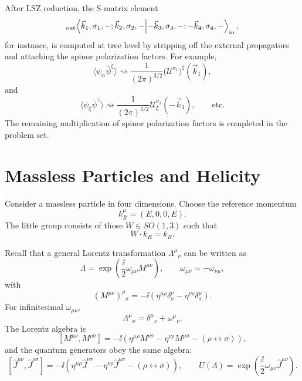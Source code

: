 After LSZ reduction, the S-matrix element
\[
  {}_{\mathrm{out}}\!\bra{
    \vec k_1,\sigma_1,-;\vec k_2,\sigma_2,-
  }
  \ket{
    -\vec k_3,\sigma_3,-;-\vec k_4,\sigma_4,-
  }_{\mathrm{in}},
\]
for instance, is computed at tree level by stripping off the external
propagators and attaching the spinor polarization factors.  For example,
\[
  \langle\psi_\alpha\bar\psi^\xi\rangle
  \rightsquigarrow
  \frac1{(2\pi)^{3/2}}
  \bigl(\mathcal U^{\sigma_1}\bigr)^\xi(\vec k_1),
\]
and
\[
  \langle\psi_\xi\bar\psi^\gamma\rangle
  \rightsquigarrow
  \frac1{(2\pi)^{3/2}}
  \mathcal U_\xi^{\sigma_3}(-\vec k_3),
  \qquad \text{etc.}
\]
The remaining multiplication of spinor polarization factors is completed
in the problem set.

\section{Massless Particles and Helicity}

Consider a massless particle in four dimensions.  Choose the reference
momentum
\[
  k_R^\mu=(E,0,0,E).
\]
The little group consists of those \(W\in SO(1,3)\) such that
\[
  W\cdot k_R=k_R.
\]

Recall that a general Lorentz transformation \(\Lambda^\mu{}_\nu\) can be
written as
\[
  \Lambda=\exp\!\left(\frac{\ii}{2}\omega_{\mu\nu}M^{\mu\nu}\right),
  \qquad
  \omega_{\mu\nu}=-\omega_{\nu\mu},
\]
with
\[
  (M^{\mu\nu})^\rho{}_\sigma
  =
  -\ii\left(
    \eta^{\mu\rho}\delta^\nu_\sigma
    -\eta^{\nu\rho}\delta^\mu_\sigma
  \right).
\]
For infinitesimal \(\omega_{\mu\nu}\),
\[
  \Lambda^\mu{}_\nu=\delta^\mu{}_\nu+\omega^\mu{}_\nu.
\]
The Lorentz algebra is
\[
  [M^{\mu\nu},M^{\rho\sigma}]
  =
  -\ii\left(
    \eta^{\mu\rho}M^{\nu\sigma}
    -\eta^{\nu\rho}M^{\mu\sigma}
    -(\rho\leftrightarrow\sigma)
  \right),
\]
and the quantum generators obey the same algebra:
\[
  [\widehat J^{\mu\nu},\widehat J^{\rho\sigma}]
  =
  -\ii\left(
    \eta^{\mu\rho}\widehat J^{\nu\sigma}
    -\eta^{\nu\rho}\widehat J^{\mu\sigma}
    -(\rho\leftrightarrow\sigma)
  \right),
  \qquad
  U(\Lambda)
  =
  \exp\!\left(\frac{\ii}{2}\omega_{\mu\nu}\widehat J^{\mu\nu}\right).
\]

